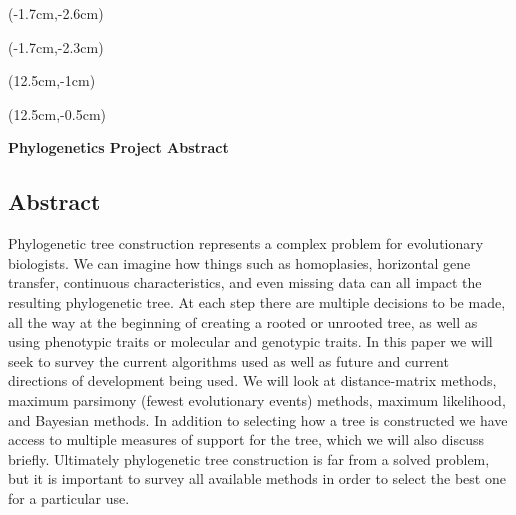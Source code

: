 \documentclass[12pt, oneside]{article}
\begin{document}
\begin{textblock*}{3cm}(-1.7cm,-2.6cm)
\end{textblock*}

\begin{textblock*}{4cm}(-1.7cm,-2.3cm)
\end{textblock*}

\begin{textblock*}{8cm}(12.5cm,-1cm)
\end{textblock*}
\begin{textblock*}{3cm}(12.5cm,-0.5cm)
\end{textblock*}

\vspace{1cm}

\begin{center}
\textbf{\Large Phylogenetics Project Abstract}
\end{center}


\subsection*{Abstract} 
Phylogenetic tree construction represents a complex problem for evolutionary biologists. We can imagine how things such as homoplasies, horizontal gene transfer, continuous characteristics, and even missing data can all impact the resulting phylogenetic tree. At each step there are multiple decisions to be made, all the way at the beginning of creating a rooted or unrooted tree, as well as using phenotypic traits or molecular and genotypic traits. In this paper we will seek to survey the current algorithms used as well as future and current directions of development being used. We will look at distance-matrix methods, maximum parsimony (fewest evolutionary events) methods, maximum likelihood, and Bayesian methods. In addition to selecting how a tree is constructed we have access to multiple measures of support for the tree, which we will also discuss briefly. Ultimately phylogenetic tree construction is far from a solved problem, but it is important to survey all available methods in order to select the best one for a particular use.
\end{document}

